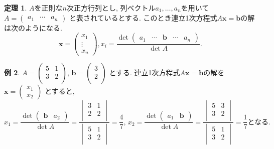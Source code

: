 \documentclass[dvipdfmx,a4paper,11pt]{article}
\theoremstyle{definition}
\newtheorem{thm}{定理}
\newtheorem{exa}[thm]{例}
\begin{document}
\begin{tcolorbox}[
    colback = white,
    colframe = green!35!black,
    fonttitle = \bfseries,
    breakable = true]
    \begin{thm}
$A$を正則な$n$次正方行列とし, 列ベクトル$a_1, \ldots, a_{n}$を用いて
$
A = 
\begin{pmatrix}
a_1 & \cdots & a_{n}
\end{pmatrix}
$
と表されているとする.
このとき連立1次方程式$A \bm{x} =\bm{b}$の解は次のようになる.
$$
\bm{x}= \begin{pmatrix}
x_1 \\ \vdots \\ x_{n}
\end{pmatrix}, 
x_i = \frac{\det
\begin{pmatrix}
a_1 & \cdots& \bm{b}&\cdots & a_{n}
\end{pmatrix}
}{\det A}.
$$
    \end{thm}
 \end{tcolorbox}
\begin{exa}
$
A = 
\begin{pmatrix}
5 &1\\
3&2 \\ 
\end{pmatrix}
$, $
\bm{b} = 
\begin{pmatrix}
3\\
2 \\ 
\end{pmatrix}
$
とする. 
連立1次方程式$A \bm{x} =\bm{b}$の解を
$
\bm{x}= \begin{pmatrix}
x_1 \\x_2
\end{pmatrix} 
$
とすると,
$$
x_1 = \frac{\det
\begin{pmatrix}
 \bm{b}& a_{2}
\end{pmatrix}
}{\det A}
= 
\frac{ 
\begin{vmatrix}
3&1\\
2&2 \\
\end{vmatrix}
}
{
\begin{vmatrix}
5&1\\
3&2 \\
\end{vmatrix}
}
=\frac{4}{7} 
\text{, }
x_2 = \frac{\det
\begin{pmatrix}
a_{1}& \bm{b}
\end{pmatrix}
}{\det A}
= 
\frac{ 
\begin{vmatrix}
5&3\\
3&2 \\
\end{vmatrix}
}
{
\begin{vmatrix}
5&1\\
3&2 \\
\end{vmatrix}
}
=\frac{1}{7}
\text{となる.}
$$
\end{exa}
\end{document}
